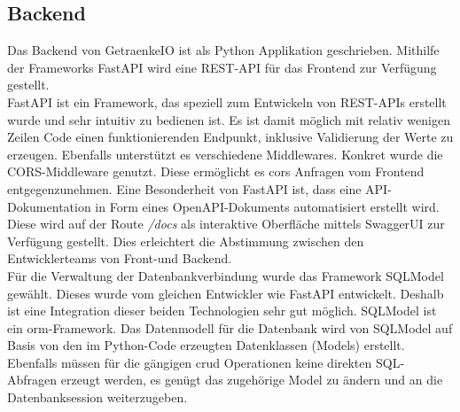 \documentclass[conference,a4paper]{cs-techrep}
\begin{document}
\subsection{Backend} %
Das Backend von GetraenkeIO ist als Python Applikation geschrieben.
Mithilfe der Frameworks FastAPI wird eine REST-API für das Frontend zur Verfügung gestellt. \\  
FastAPI ist ein Framework, das speziell zum Entwickeln von REST-APIs erstellt wurde und sehr intuitiv zu bedienen ist.
Es ist damit möglich mit relativ wenigen Zeilen Code einen funktionierenden Endpunkt, inklusive Validierung der Werte zu erzeugen. Ebenfalls unterstützt es verschiedene Middlewares. Konkret wurde die CORS-Middleware genutzt. Diese ermöglicht es \ac{cors} Anfragen vom Frontend entgegenzunehmen.
Eine Besonderheit von FastAPI ist, dass eine API-Dokumentation in Form eines OpenAPI-Dokuments \cite{openapi} automatisiert erstellt wird. Diese wird auf der Route \emph{/docs} als interaktive Oberfläche mittels SwaggerUI  \cite{swagger} zur Verfügung gestellt. Dies erleichtert die Abstimmung zwischen den Entwicklerteams von Front-und Backend. \\  
Für die Verwaltung der Datenbankverbindung wurde das Framework SQLModel gewählt. Dieses wurde vom gleichen Entwickler wie FastAPI entwickelt. Deshalb ist eine Integration dieser beiden Technologien sehr gut möglich. SQLModel ist ein \ac{orm}-Framework.
Das Datenmodell für die Datenbank wird von SQLModel auf Basis von den im Python-Code erzeugten Datenklassen (Models) erstellt. Ebenfalls müssen für die gängigen \ac{crud} Operationen keine direkten SQL-Abfragen erzeugt werden, es genügt das zugehörige Model  zu ändern und an die Datenbanksession weiterzugeben.
\end{document}
